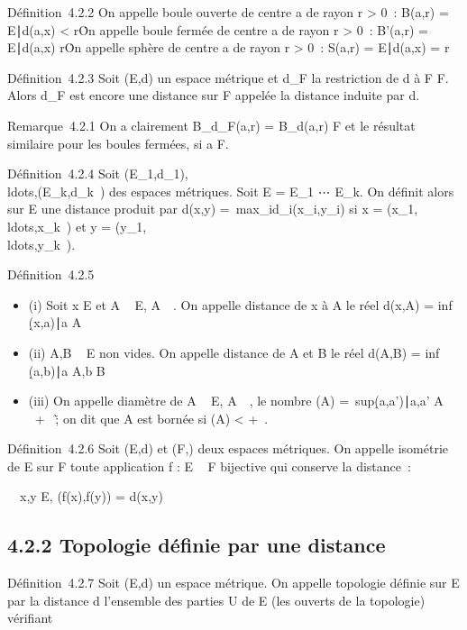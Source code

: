 \documentclass[]{article}
\begin{document}
Définition~4.2.2 On appelle boule ouverte de centre a de rayon r
> 0~: B(a,r) = \x \in
E∣d(a,x) < r\.

On appelle boule fermée de centre a de rayon r > 0~:
B'(a,r) = \x \in E∣d(a,x) \leq
r\.

On appelle sphère de centre a de rayon r > 0~: S(a,r) =
\x \in E∣d(a,x) =
r\

Définition~4.2.3 Soit (E,d) un espace métrique et d_F la
restriction de d à F \times F. Alors d_F est encore une distance sur
F appelée la distance induite par d.

Remarque~4.2.1 On a clairement B_d_F(a,r) =
B_d(a,r) \bigcap F et le résultat similaire pour les boules fermées,
si a \in F.

Définition~4.2.4 Soit
(E_1,d_1),\\ldots,(E_k,d_k~)
des espaces métriques. Soit E = E_1
\times⋯ \times E_k. On définit alors sur E une
distance produit par d(x,y) =\
max_id_i(x_i,y_i) si x =
(x_1,\\ldots,x_k~)
et y =
(y_1,\\ldots,y_k~).

Définition~4.2.5

\begin{itemize}
\itemsep1pt\parskip0pt
\item
  (i) Soit x \in E et A \subset~ E, A\neq~\varnothing~. On appelle
  distance de x à A le réel d(x,A) = inf~
  \d(x,a)∣a \in
  A\
\item
  (ii) A,B \subset~ E non vides. On appelle distance de A et B le réel d(A,B)
  = inf~
  \d(a,b)∣a \in A,b \in
  B\
\item
  (iii) On appelle diamètre de A \subset~ E, A\neq~\varnothing~, le
  nombre \delta(A) =\
  sup\d(a,a')∣a,a' \in
  A\ \in {}~ \cup\ + \infty~\~; on
  dit que A est bornée si \delta(A) < +\infty~.
\end{itemize}

Définition~4.2.6 Soit (E,d) et (F,\delta) deux espaces métriques. On appelle
isométrie de E sur F toute application f : E \rightarrow~ F bijective qui conserve
la distance~:

\forall~~x,y \in E, \delta(f(x),f(y)) = d(x,y)

\subsection{4.2.2 Topologie définie par une distance}

Définition~4.2.7 Soit (E,d) un espace métrique. On appelle topologie
définie sur E par la distance d l'ensemble des parties U de E (les
ouverts de la topologie) vérifiant
\end{document}
